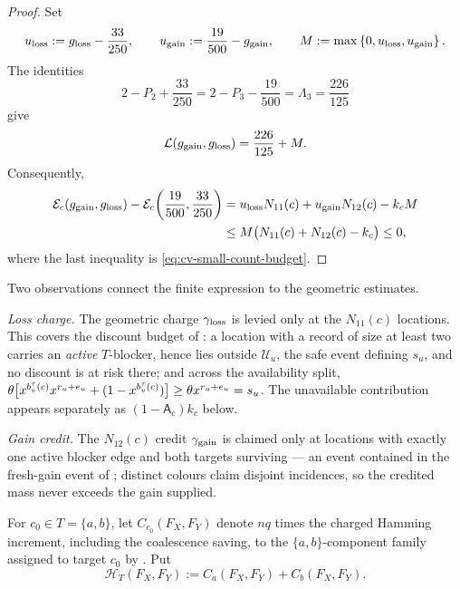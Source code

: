 \begin{proof}
Set
\[
 u_{\rm loss}:=g_{\rm loss}-\frac{33}{250},\qquad
 u_{\rm gain}:=\frac{19}{500}-g_{\rm gain},\qquad
 M:=\max\left\{0,u_{\rm loss},u_{\rm gain}\right\}.
\]
The identities
\[
 2-P_2+\frac{33}{250}
 =2-P_3-\frac{19}{500}
 =\Lambda_3=\frac{226}{125}
\]
give
\[
 \mathcal L(g_{\rm gain},g_{\rm loss})=\frac{226}{125}+M.
\]
Consequently,
\begin{align*}
 \mathcal E_c(g_{\rm gain},g_{\rm loss})
 -\mathcal E_c\!\left(\frac{19}{500},\frac{33}{250}\right)
 &=u_{\rm loss}N_{11}(c)+u_{\rm gain}N_{12}(c)-k_cM\\
 &\le M\bigl(N_{11}(c)+N_{12}(c)-k_c\bigr)\le0,
\end{align*}
where the last inequality is \eqref{eq:cv-small-count-budget}.
\end{proof}

Two observations connect the finite expression to the geometric estimates.

\smallskip\noindent\emph{Loss charge.}
The geometric charge $\gamma_{\rm loss}$
is levied only at the $N_{11}(c)$ locations. This covers the discount
budget of : a location with a record of size at least two
carries an \emph{active} \(T\)-blocker, hence lies outside
\(\mathcal U_u\), the safe event defining \(s_u\), and no discount is
at risk there; and across the
availability split,
$\theta\bigl[x^{b_v^\tau(c)}x^{r_u+e_u}+(1-x^{b_v^\tau(c)})\bigr]\ge
\theta x^{r_u+e_u}=s_u$.  The unavailable contribution appears
separately as $(1-\mathsf A_c)k_c$ below.

\smallskip\noindent\emph{Gain credit.}
The $N_{12}(c)$ credit $\gamma_{\rm gain}$ is claimed
only at locations with exactly one active blocker edge and both targets
surviving --- an event contained in the fresh-gain event of
; distinct colours claim disjoint incidences, so
the credited mass never exceeds the gain supplied.

For \(c_0\in T=\{a,b\}\), let \(C_{c_0}(F_X,F_Y)\) denote \(nq\) times
the charged Hamming increment, including the coalescence saving,
to the \(\{a,b\}\)-component family assigned to target \(c_0\) by
.  Put
\[
  \mathcal H_T(F_X,F_Y):=C_a(F_X,F_Y)+C_b(F_X,F_Y).
\]

